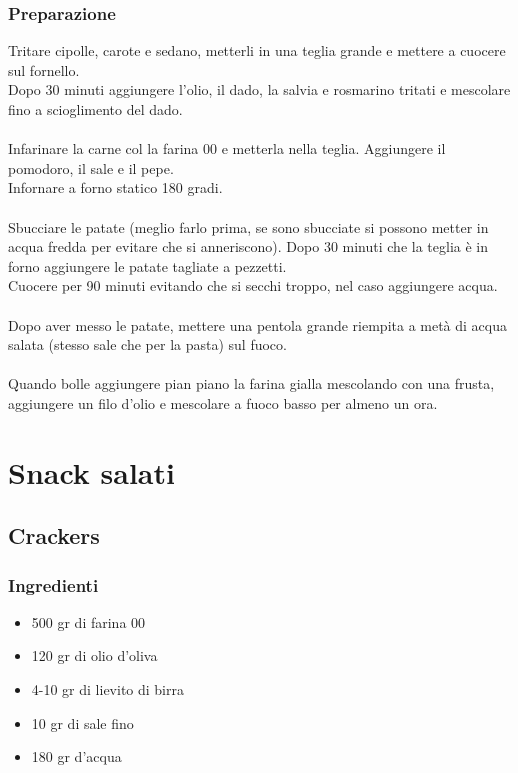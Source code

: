 \documentclass[12pt, a4paper]{article}
\begin{document}
\clearpage
\subsubsection{Preparazione}
	Tritare cipolle, carote e sedano, metterli in una teglia grande
	e mettere a cuocere sul fornello.\\
	Dopo 30 minuti aggiungere l'olio, il dado, la salvia e rosmarino
	tritati e mescolare fino a scioglimento del dado.\\\\
	Infarinare la carne col la farina 00 e metterla nella teglia.
	Aggiungere il pomodoro, il sale e il pepe.\\
	Infornare a forno statico 180 gradi.\\\\
	Sbucciare le patate (meglio farlo prima, se sono sbucciate si
	possono metter in acqua fredda per evitare che si anneriscono).
	Dopo 30 minuti che la teglia è in forno aggiungere le patate
	tagliate a pezzetti.\\
	Cuocere per 90 minuti evitando che si secchi troppo, nel caso
	aggiungere acqua.\\\\
	Dopo aver messo le patate, mettere una pentola grande riempita
	a metà di acqua salata (stesso sale che per la pasta) sul fuoco.\\\\
	Quando bolle aggiungere pian piano la farina gialla mescolando
	con una frusta, aggiungere un filo d'olio e mescolare a fuoco
	basso per almeno un ora.
\clearpage

\section{Snack salati}

\subsection{Crackers}

\subsubsection{Ingredienti}
\begin{itemize}
\item	500 gr di farina 00
\item	120 gr di olio d'oliva
\item	4-10 gr di lievito di birra
\item	10 gr di sale fino
\item	180 gr d'acqua
\end{itemize}
\end{document}
